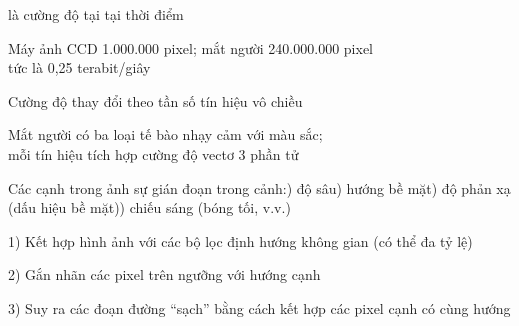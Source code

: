 \documentclass{article}
\begin{document}
\begin{huge}
 là cường độ tại  tại thời điểm 

Máy ảnh CCD \mat{$\approx$} 1.000.000 pixel; mắt người \mat{$\approx$} 240.000.000 pixel\\
tức là 0,25 terabit/giây


Cường độ thay đổi theo tần số \mat{$\rightarrow$} tín hiệu vô chiều

\vspace*{0.2in}

\textwidth
{}

Mắt người có ba loại tế bào nhạy cảm với màu sắc;\\
mỗi tín hiệu tích hợp cường độ vectơ 3 phần tử \mat{$\implies$}




\vspace*{0.2in}

\textwidth
{}

\vspace*{-1in}

Các cạnh trong ảnh \mat{$\Leftarrow$} sự gián đoạn trong cảnh:) độ sâu) hướng bề mặt) độ phản xạ (dấu hiệu bề mặt)) chiếu sáng (bóng tối, v.v.)



1) Kết hợp hình ảnh với các bộ lọc định hướng không gian (có thể đa tỷ lệ)
\mat{\[
  E_{\theta}(x,y) = \int_{-\infty}^{\infty} \int_{-\infty}^{\infty} f_{\theta}(u,v) I(x+u,y+v)\,du\,dv
\]}%

\vspace*{-0.3in}

\textwidth
{}

\vspace*{-0.3in}

2) Gắn nhãn các pixel trên ngưỡng với hướng cạnh

3) Suy ra các đoạn đường ``sạch'' bằng cách kết hợp các pixel cạnh có cùng hướng

\vspace*{0.2in}


\end{huge}
\end{document}
